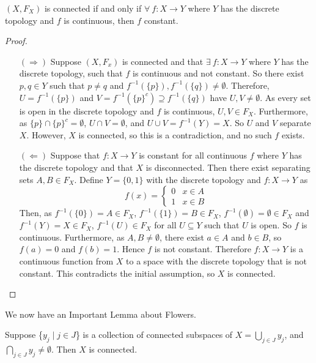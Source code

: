 \begin{smallfact}
$(X, F_X)$ is connected if and only if $\forall \ f : X \to Y$ where $Y$ has the discrete topology and $f$ is continuous, then $f$ constant.
\end{smallfact}
\begin{proof}
\begin{itemize}
\item[$(\Rightarrow)$]
Suppose $(X,F_x)$ is connected and that $\exists \ f : X \to Y$ where $Y$ has the discrete topology, such that $f$ is continuous and not constant.  So there exist $p,q \in Y$ such that $p \neq q$ and $f^{-1}(\{p\}), f^{-1}(\{q\}) \neq \emptyset$.  Therefore, $U = f^{-1}(\{p\})$ and $V = f^{-1}(\{p\}^c) \supseteq f^{-1}(\{q\})$ have $U,V \neq \emptyset$.  As every set is open in the discrete topology and $f$ is continuous, $U,V \in F_X$.  Furthermore, as $\{p\} \cap \{p\}^c = \emptyset$, $U \cap V = \emptyset$, and $U \cup V = f^{-1}(Y) = X$.  So $U$ and $V$ separate $X$.  However, $X$ is connected, so this is a contradiction, and no such $f$ exists.
\item[$(\Leftarrow)$] 
Suppose that $f : X \to Y$ is constant for all continuous $f$ where $Y$ has the discrete topology and that $X$ is disconnected.  Then there exist separating sets $A,B \in F_X$.  Define $Y = \{0,1\}$ with the discrete topology and $f : X \to Y$ as 
\[f(x) = \left\{ \begin{array}{cc} 0 & x \in A \\ 1 & x \in B\end{array}\right.\]
Then, as $f^{-1}(\{0\}) = A \in F_X$, $f^{-1}(\{1\}) = B \in F_X$, $f^{-1}(\emptyset) = \emptyset \in F_X$ and $f^{-1}(Y) = X \in F_X$, $f^{-1}(U) \in F_X$ for all $U \subseteq Y$ such that $U$ is open.  So $f$ is continuous.  Furthermore, as $A,B \neq \emptyset$, there exist $a \in A$ and $b \in B$, so $f(a) = 0$ and $f(b) = 1$.  Hence $f$ is not constant.  Therefore $f : X \to Y$ is a continuous function from $X$ to a space with the discrete topology that is not constant.  This contradicts the initial assumption, so $X$ is connected.
\end{itemize}
\end{proof}

We now have an Important Lemma about Flowers.
\begin{lemma}
Suppose \{$y_j \mid j \in J$\} is a collection of connected subspaces of $X = \displaystyle{\bigcup_{j \in J} y_j}$,  and $\displaystyle{\bigcap_{j \in J} y_j} \neq \emptyset$. Then $X$ is connected.
\end{lemma}

